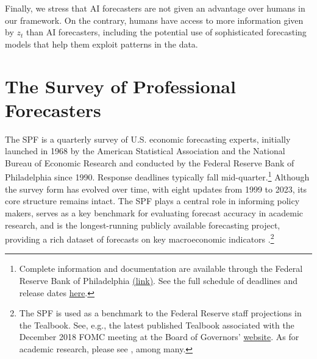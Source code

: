 \documentclass[11pt,letterpaper]{scrartcl}
\begin{document}
Finally, we stress that AI forecasters are not given an advantage over humans in our framework. On the contrary, humans have access to more information given by $z_t$ than AI forecasters, including the potential use of sophisticated forecasting models that help them exploit patterns in the data.

\section{The Survey of Professional Forecasters}\label{sec:spf}

The SPF is a quarterly survey of U.S. economic forecasting experts, initially launched in 1968 by the American Statistical Association and the National Bureau of Economic Research and conducted by the Federal Reserve Bank of Philadelphia since 1990. Response deadlines typically fall mid-quarter.\footnote{Complete information and documentation are available through the Federal Reserve Bank of Philadelphia \href{https://www.philadelphiafed.org/surveys-and-data/real-time-data-research/survey-of-professional-forecasters}{(link)}. See the full schedule of deadlines and release dates \href{https://www.philadelphiafed.org/-/media/frbp/assets/surveys-and-data/survey-of-professional-forecasters/spf-release-dates.txt?la=en&hash=B0031909EE9FFE77B26E57AC5FB39899}{here}.} Although the survey form has evolved over time, with eight updates from 1999 to 2023, its core structure remains intact. The SPF plays a central role in informing policy makers, serves as a key benchmark for evaluating forecast accuracy in academic research, and is the longest-running publicly available forecasting project, providing a rich dataset of forecasts on key macroeconomic indicators \citep{croushore1993introducing}.\footnote{The SPF is used as a benchmark to the Federal Reserve staff projections in the Tealbook. See, e.g., the latest published Tealbook associated with the December 2018 FOMC meeting at the Board of Governors' \href{https://www.federalreserve.gov/monetarypolicy/files/FOMC20181219tealbooka20181207.pdf}{website}. As for academic research, please see \cite{diebold1997evaluating, giordani2003inflation, engelberg2009comparing, manzan2011differential, clements2014forecast, rossi2015macroeconomic, clements2017model, croushore2019fifty}, among many.} 
\end{document}
